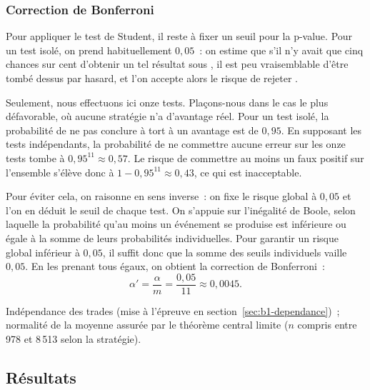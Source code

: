 \subsubsection*{Correction de Bonferroni}

Pour appliquer le test de Student, il reste à fixer un seuil pour la
p-value. Pour un test isolé, on prend habituellement \(0{,}05\)~: on
estime que s'il n'y avait que cinq chances sur cent d'obtenir un tel
résultat sous \Hzero{}, il est peu vraisemblable d'être tombé dessus par
hasard, et l'on accepte alors le risque de rejeter \Hzero{}.

Seulement, nous effectuons ici onze tests. Plaçons-nous dans le cas le
plus défavorable, où aucune stratégie n'a d'avantage réel. Pour un test
isolé, la probabilité de ne pas conclure à tort à un avantage est de
\(0{,}95\). En supposant les tests indépendants, la probabilité de ne
commettre aucune erreur sur les onze tests tombe à
\(0{,}95^{11} \approx 0{,}57\). Le risque de commettre au moins un faux
positif sur l'ensemble s'élève donc à \(1 - 0{,}95^{11} \approx
0{,}43\), ce qui est inacceptable.

Pour éviter cela, on raisonne en sens inverse~: on fixe le risque global
à \(0{,}05\) et l'on en déduit le seuil de chaque test. On s'appuie sur
l'inégalité de Boole, selon laquelle la probabilité qu'au moins un
événement se produise est inférieure ou égale à la somme de leurs
probabilités individuelles. Pour garantir un risque global inférieur à
\(0{,}05\), il suffit donc que la somme des seuils individuels vaille
\(0{,}05\). En les prenant tous égaux, on obtient la correction de
Bonferroni~:
\[
  \alpha' = \frac{\alpha}{m} = \frac{0{,}05}{11} \approx 0{,}0045 .
\]

\begin{conditions}
Indépendance des trades (mise à l'épreuve en
section~\ref{sec:b1-dependance})~; normalité de la moyenne assurée par
le théorème central limite ($n$ compris entre 978 et 8\,513 selon la
stratégie).
\end{conditions}

\subsection{Résultats}

